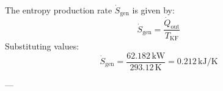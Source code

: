 The entropy production rate \( \dot{S}_{\text{gen}} \) is given by:  
\[
\dot{S}_{\text{gen}} = \frac{\dot{Q}_{\text{out}}}{T_{\text{KF}}}
\]  
Substituting values:  
\[
\dot{S}_{\text{gen}} = \frac{62.182 \, \text{kW}}{293.12 \, \text{K}} = 0.212 \, \text{kJ/K}
\]  

---